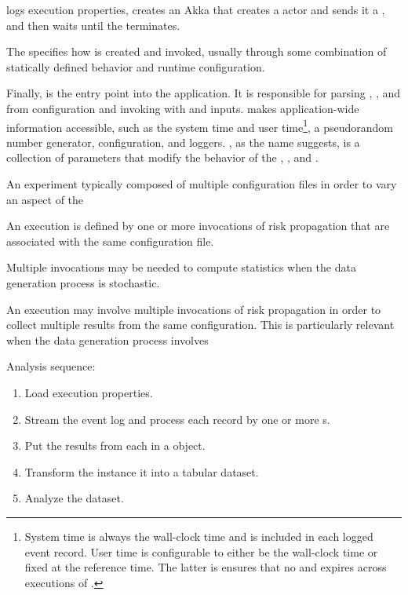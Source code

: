  logs execution properties, creates an Akka  that creates a  actor and sends it a , and then waits until the  terminates.

The  specifies how  is created and invoked, usually through some combination of statically defined behavior and runtime configuration.

Finally,  is the entry point into the application. It is responsible for parsing , , and  from configuration and invoking  with  and  inputs.  makes application-wide information accessible, such as the system time and user time\footnote{System time is always the wall-clock time and is included in each logged event record. User time is configurable to either be the wall-clock time or fixed at the reference time. The latter is ensures that no  and  expires across executions of .}, a pseudorandom number generator,  configuration, and loggers. , as the name suggests, is a collection of parameters that modify the behavior of the , , and .

An experiment typically composed of multiple configuration files in order to vary an aspect of the 

An execution is defined by one or more invocations of risk propagation that are associated with the same configuration file. 

Multiple invocations may be needed to compute statistics when the data generation process is stochastic.

An execution may involve multiple invocations of risk propagation in order to collect multiple results from the same configuration. This is particularly relevant when the data generation process involves 

Analysis sequence:

\begin{enumerate}
  \item Load execution properties.
  \item Stream the event log and process each record by one or more s.
  \item Put the results from each  in a  object.
  \item Transform the  instance it into a tabular dataset.
  \item Analyze the dataset.
\end{enumerate}

